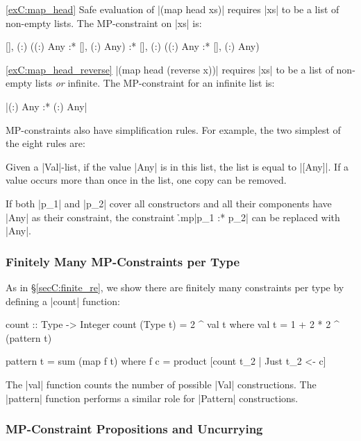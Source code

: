 \begin{examplerevisit}{\ref{exC:map_head}} Safe evaluation of |(map head xs)| requires |xs| to be a list of non-empty lists. The MP-constraint on |xs| is:

\ignore\begin{code}
{[], (:) ({(:) Any} :* {[], (:) Any})} :*
{[], (:) ({(:) Any} :* {[], (:) Any})}
\end{code}
\end{examplerevisit}

\begin{examplerevisit}{\ref{exC:map_head_reverse}} |(map head (reverse x))| requires |xs| to be a list of non-empty lists \textit{or} infinite. The MP-constraint for an infinite list is: \ignore|{(:) Any} :* {(:) Any}|
\end{examplerevisit}

\bigskip

MP-constraints also have simplification rules.  For example, the two simplest of the eight rules are:

 Given a |Val|-list, if the value |Any| is in this list, the list is equal to |[Any]|. If a value occurs more than once in the list, one copy can be removed.

 If both |p_1| and |p_2| cover all constructors and all their components have |Any| as their constraint, the constraint \h{.mp}|p_1 :* p_2| can be replaced with |Any|.


\subsubsection{Finitely Many MP-Constraints per Type}

As in \S\ref{secC:finite_re}, we show there are finitely many constraints per type by defining a |count| function:

\begin{code}
count :: Type -> Integer
count (Type t) = 2 ^ val t
    where val t = 1 + 2 * 2 ^ (pattern t)

pattern t = sum (map f t)
    where f c = product [count t_2 | Just t_2 <- c]
\end{code}

The |val| function counts the number of possible |Val| constructions. The |pattern| function performs a similar role for |Pattern| constructions.


\subsubsection{MP-Constraint Propositions and Uncurrying}

